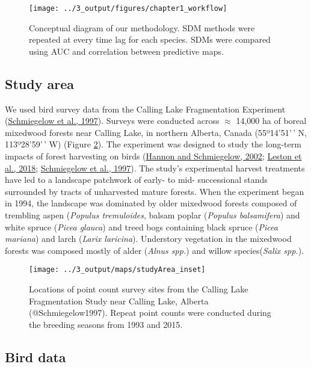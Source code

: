 \documentclass[
]{article}
\begin{document}
\begin{figure}[htb]
\texttt{[image: ../3\_output/figures/chapter1\_workflow]} \caption{Conceptual diagram of our methodology. SDM methods were repeated at every time lag for each species. SDMs were compared using AUC and correlation between predictive maps.}\label{fig:workflow}
\end{figure}

\hypertarget{study-area}{%
\subsection{Study area}\label{study-area}}

We used bird survey data from the Calling Lake Fragmentation Experiment (\protect\hyperlink{ref-Schmiegelow1997}{Schmiegelow et al., 1997}). Surveys were conducted across \(\approx\) 14,000 ha of boreal mixedwood forests near Calling Lake, in northern Alberta, Canada (55º14'51'\,' N, 113º28'59'\,' W) (Figure \ref{fig:studyArea}). The experiment was designed to study the long-term impacts of forest harvesting on birds (\protect\hyperlink{ref-hannonCorridorsMayNot2002}{Hannon and Schmiegelow, 2002}; \protect\hyperlink{ref-lestonLongtermChangesBoreal2018}{Leston et al., 2018}; \protect\hyperlink{ref-Schmiegelow1997}{Schmiegelow et al., 1997}). The study's experimental harvest treatments have led to a landscape patchwork of early- to mid- successional stands surrounded by tracts of unharvested mature forests. When the experiment began in 1994, the landscape was dominated by older mixedwood forests composed of trembling aspen (\emph{Populus tremuloides}, balsam poplar (\emph{Populus balsamifera}) and white spruce (\emph{Picea glauca}) and treed bogs containing black spruce (\emph{Picea mariana}) and larch (\emph{Larix laricina}). Understory vegetation in the mixedwood forests was composed mostly of alder (\emph{Alnus spp.}) and willow species(\emph{Salix spp.}).

\begin{figure}[htb]
\texttt{[image: ../3\_output/maps/studyArea\_inset]} \caption{Locations of point count survey sites from the Calling Lake Fragmentation Study near Calling Lake, Alberta (@Schmiegelow1997). Repeat point counts were conducted during the breeding seasons from 1993 and 2015.}\label{fig:studyArea}
\end{figure}

\hypertarget{bird-data}{%
\subsection{Bird data}\label{bird-data}}
\end{document}
